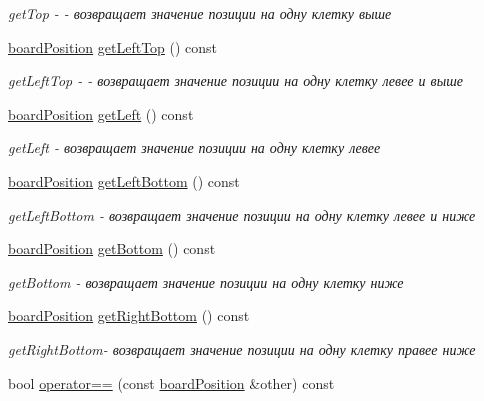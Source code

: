 \begin{DoxyCompactItemize}
\begin{DoxyCompactList}\small\item\em get\+Top -\/ -\/ возвращает значение позиции на одну клетку выше \end{DoxyCompactList}\item 
\hyperlink{classboard_position}{board\+Position} \hyperlink{classboard_position_a04b42f0b30728baa2377bc96fd4bb77f}{get\+Left\+Top} () const 
\begin{DoxyCompactList}\small\item\em get\+Left\+Top -\/ -\/ возвращает значение позиции на одну клетку левее и выше \end{DoxyCompactList}\item 
\hyperlink{classboard_position}{board\+Position} \hyperlink{classboard_position_aa119bc1c9a676d2dae7e04983e8d77dd}{get\+Left} () const 
\begin{DoxyCompactList}\small\item\em get\+Left -\/ возвращает значение позиции на одну клетку левее \end{DoxyCompactList}\item 
\hyperlink{classboard_position}{board\+Position} \hyperlink{classboard_position_ae553cedeba595f4e968ca32830f65d80}{get\+Left\+Bottom} () const 
\begin{DoxyCompactList}\small\item\em get\+Left\+Bottom -\/ возвращает значение позиции на одну клетку левее и ниже \end{DoxyCompactList}\item 
\hyperlink{classboard_position}{board\+Position} \hyperlink{classboard_position_a781e1db951f0fd907d96b5d71c115a35}{get\+Bottom} () const 
\begin{DoxyCompactList}\small\item\em get\+Bottom -\/ возвращает значение позиции на одну клетку ниже \end{DoxyCompactList}\item 
\hyperlink{classboard_position}{board\+Position} \hyperlink{classboard_position_a4d667aa60ded8c0a9bfbee9f5c9bd43f}{get\+Right\+Bottom} () const 
\begin{DoxyCompactList}\small\item\em get\+Right\+Bottom-\/ возвращает значение позиции на одну клетку правее ниже \end{DoxyCompactList}\item 
bool \hyperlink{classboard_position_aed1e4bc43298000671a6dd7266fb7db8}{operator==} (const \hyperlink{classboard_position}{board\+Position} \&other) const 

\end{DoxyCompactItemize}
